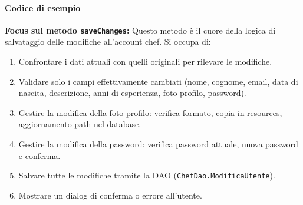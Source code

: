 \paragraph{Codice di esempio}
\textbf{Focus sul metodo \texttt{saveChanges}:}
Questo metodo è il cuore della logica di salvataggio delle modifiche all'account chef. Si occupa di:
\begin{enumerate}
    \item Confrontare i dati attuali con quelli originali per rilevare le modifiche.
    \item Validare solo i campi effettivamente cambiati (nome, cognome, email, data di nascita, descrizione, anni di esperienza, foto profilo, password).
    \item Gestire la modifica della foto profilo: verifica formato, copia in resources, aggiornamento path nel database.
    \item Gestire la modifica della password: verifica password attuale, nuova password e conferma.
    \item Salvare tutte le modifiche tramite la DAO (\texttt{ChefDao.ModificaUtente}).
    \item Mostrare un dialog di conferma o errore all'utente.
\end{enumerate}

